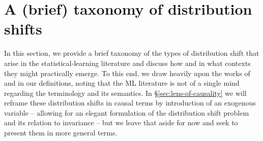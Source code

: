 


\section{A (brief) taxonomy of distribution shifts}
In this section, we provide a brief taxonomy of the types of distribution shift that arise in the
statistical-learning literature and discuss how and in what contexts they might practically emerge.
%
To this end, we draw heavily upon the works of \cite{moreno2012unifying} and
\cite{castro2020causality} in our definitions, noting that the ML literature is not of a
single mind regarding the terminology and its semantics.
%
In \S\ref{sec:lens-of-causality} we will reframe these distribution shifts in causal terms by
introduction of an exogenous variable -- allowing for an elegant formulation of the distribution
shift problem and its relation to invariance -- but we leave that aside for now and seek to present
them in more general terms.
